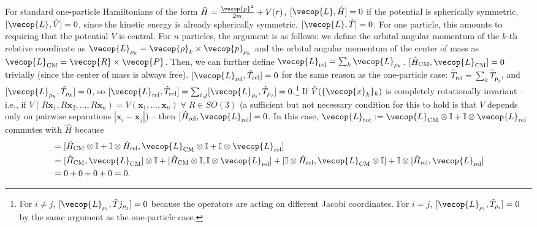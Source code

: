  For standard one-particle Hamiltonians of the form $\hat{H}=\frac{\vecop{p}^2}{2m} + V(r)$, $[\vecop{L}, \hat{H}]=0$ if the potential is spherically symmetric, $[\vecop{L},\hat{V}]=0$, since the kinetic energy is already spherically symmetric, $[\vecop{L}, \hat{T}]=0$. For one particle, this amounts to requiring that the potential $V$ is central. For $n$ particles, the argument is as follows: we define the orbital angular momentum of the $k$-th relative coordinate as $\vecop{L}_{\mathbf{\rho}_k} = \vecop{\rho}_k\times \vecop{p}_{\mathbf{\rho}_k}$ and the orbital angular momentum of the center of mass as $\vecop{L}_{\text{CM}} = \vecop{R} \times \vecop{P}$. Then, we can further define $\vecop{L}_{\text{rel}}=\sum_k \vecop{L}_{\mathbf{\rho}_k}$. $[\hat{H}_{\text{CM}},\vecop{L}_{\text{CM}}]=0$ trivially (since the center of mass is always free). $[\vecop{L}_\text{rel},\hat{T}_\text{rel}]=0$ for the same reason as the one-particle case: $\hat{T}_\text{rel}=\sum_k \hat{T}_{\mathbf{\rho}_k}$, and $[\vecop{L}_{\mathbf{\rho}_k},\hat{T}_{\mathbf{\rho}_k}]=0$, so $[\vecop{L}_{\text{rel}}, \hat{T}_{\text{rel}}]=\sum_{i,j}[\vecop{L}_{\mathbf{\rho}_i},\hat{T}_{\mathbf{\rho}_j}]=0.$\footnote{
For $i\ne j$, $[\vecop{L}_{\mathbf{\rho}_i}, \hat{T}j_{\mathbf{\rho}_j}]=0$ because the operators are acting on different Jacobi coordinates. For $i=j$, $[\vecop{L}_{\mathbf{\rho}_i},\hat{T}_{\mathbf{\rho}_i}]=0$ by the same argument as the one-particle case.
}
If $\hat{V}(\{\vecop{x}_k\}_k)$ is completely rotationally invariant -- i.e., if $V(R\mathbf{x}_1, R\mathbf{x}_2, \dots, R\mathbf{x}_n)=V(\mathbf{x}_1, \dots, \mathbf{x}_n)\;\forall\; R\in SO(3)$ (a sufficient but not necessary condition for this to hold is that $V$ depends only on pairwise separations $|\mathbf{x}_i-\mathbf{x}_j|$) -- then $[\hat{H}_{\text{rel}},\vecop{L}_{\text{rel}}]=0$. In this case, $\vecop{L}_{\text{tot}}:=\vecop{L}_{\text{CM}}\otimes \mathbb{I}+\mathbb{I}\otimes\vecop{L}_{\text{rel}}$ commutes with $\hat{H}$ because
\begin{align*}
    [\hat{H}, \vecop{L}_\text{tot}] &= [\hat{H}_{\text{CM}}\otimes \mathbb{I}+\mathbb{I}\otimes \hat{H}_{\text{rel}}, \vecop{L}_{\text{CM}}\otimes\mathbb{I} + \mathbb{I}\otimes \vecop{L}_{\text{rel}}]\\
    &= [\hat{H}_{\text{CM}}, \vecop{L}_{\text{CM}}] \otimes \mathbb{I} + [\hat{H}_\text{CM}\otimes \mathbb{I}, \mathbb{I}\otimes \vecop{L}_\text{rel}]+[\mathbb{I}\otimes \hat{H}_\text{rel}, \vecop{L}_\text{CM}\otimes \mathbb{I}] + \mathbb{I}\otimes[\hat{H}_{\text{rel}},\vecop{L}_\text{rel}]\\
    &= 0 + 0 + 0 + 0 = 0.
\end{align*}
